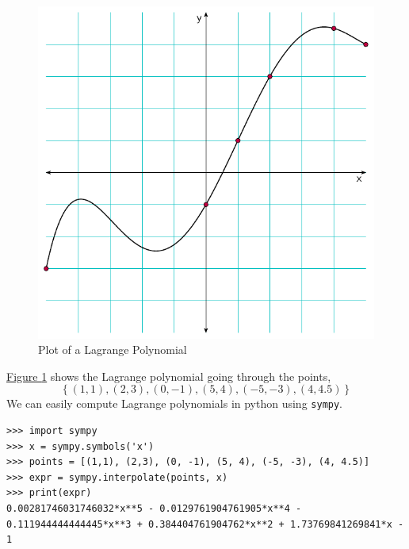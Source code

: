 \begin{figure}[!htpb]
\centering
\includegraphics[scale=0.75]{polynomials/figures/lagrange_poly_plot1.pdf}
\caption{Plot of a Lagrange Polynomial}
\label{fig:lagrange_poly_plot1}
\end{figure}

\hyperref[fig:lagrange_poly_plot1]{Figure \ref{fig:lagrange_poly_plot1}} shows the Lagrange polynomial going through 
the points, 
\[ \left\{(1,1), (2,3), (0, -1), (5, 4), (-5, -3), (4, 4.5) \right\}\] 
We can easily compute Lagrange polynomials in python using \texttt{sympy}.

\begin{mdcode}
\begin{verbatim}
>>> import sympy
>>> x = sympy.symbols('x')
>>> points = [(1,1), (2,3), (0, -1), (5, 4), (-5, -3), (4, 4.5)]
>>> expr = sympy.interpolate(points, x)
>>> print(expr)
0.00281746031746032*x**5 - 0.0129761904761905*x**4 - 0.111944444444445*x**3 + 0.384404761904762*x**2 + 1.73769841269841*x - 1
\end{verbatim}
\end{mdcode}

